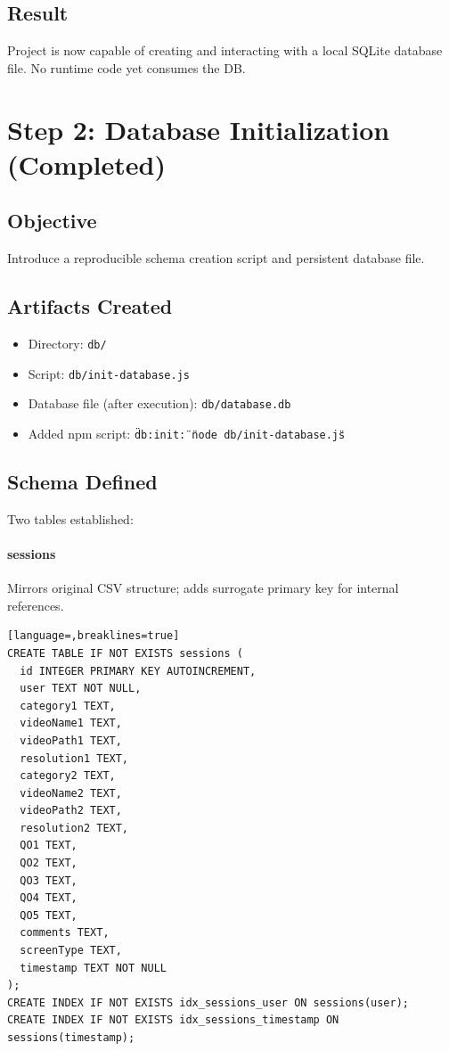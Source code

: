 \documentclass[11pt,a4paper]{article}
\begin{document}
\subsection{Result}
Project is now capable of creating and interacting with a local SQLite database file. No runtime code yet consumes the DB.

\section{Step 2: Database Initialization (Completed)}
\subsection{Objective}
Introduce a reproducible schema creation script and persistent database file.

\subsection{Artifacts Created}
\begin{itemize}[noitemsep]
  \item Directory: \texttt{db/}
  \item Script: \texttt{db/init-database.js}
  \item Database file (after execution): \texttt{db/database.db}
  \item Added npm script: \texttt{\"db:init\": \"node db/init-database.js\"}
\end{itemize}

\subsection{Schema Defined}
Two tables established:

\paragraph{sessions}
Mirrors original CSV structure; adds surrogate primary key for internal references.
\begin{lstlisting}[language=,breaklines=true]
CREATE TABLE IF NOT EXISTS sessions (
  id INTEGER PRIMARY KEY AUTOINCREMENT,
  user TEXT NOT NULL,
  category1 TEXT,
  videoName1 TEXT,
  videoPath1 TEXT,
  resolution1 TEXT,
  category2 TEXT,
  videoName2 TEXT,
  videoPath2 TEXT,
  resolution2 TEXT,
  QO1 TEXT,
  QO2 TEXT,
  QO3 TEXT,
  QO4 TEXT,
  QO5 TEXT,
  comments TEXT,
  screenType TEXT,
  timestamp TEXT NOT NULL
);
CREATE INDEX IF NOT EXISTS idx_sessions_user ON sessions(user);
CREATE INDEX IF NOT EXISTS idx_sessions_timestamp ON sessions(timestamp);
\end{lstlisting}
\end{document}
